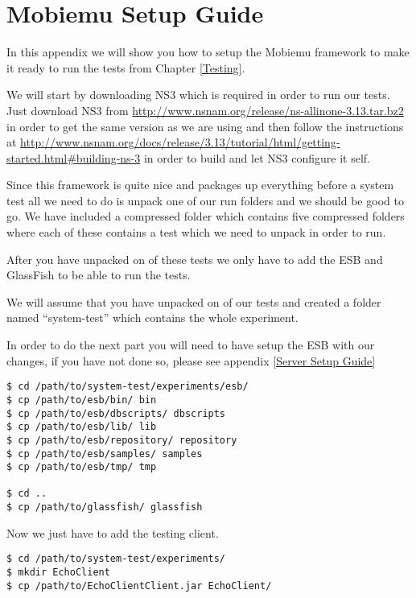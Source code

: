 \section{Mobiemu Setup Guide}\label{Mobiemu Setup Guide}
In this appendix we will show you how to setup the Mobiemu framework to make it ready to run the tests from Chapter \ref{Testing}.

We will start by downloading NS3 which is required in order to run our tests. Just download NS3 from \url{http://www.nsnam.org/release/ns-allinone-3.13.tar.bz2} in order to get the same version as we are using and then follow the instructions at \url{http://www.nsnam.org/docs/release/3.13/tutorial/html/getting-started.html#building-ns-3} in order to build and let NS3 configure it self.

Since this framework is quite nice and packages up everything before a system test all we need to do is unpack one of our run folders and we should be good to go. We have included a compressed folder which contains five compressed folders where each of these contains a test which we need to unpack in order to run.

After you have unpacked on of these tests we only have to add the ESB and GlassFish to be able to run the tests.

We will assume that you have unpacked on of our tests and created a folder named “system-test” which contains the whole experiment.

\begin{shaded}
In order to do the next part you will need to have setup the ESB with our changes, if you have not done so, please see appendix \ref{Server Setup Guide}
\end{shaded}

\lstset{language=bash}
\begin{lstlisting}[frame=single, caption={Copy ESB and GlassFish into System test}, label=mobiemu:copy esb, breaklines=true]
$ cd /path/to/system-test/experiments/esb/
$ cp /path/to/esb/bin/ bin
$ cp /path/to/esb/dbscripts/ dbscripts
$ cp /path/to/esb/lib/ lib
$ cp /path/to/esb/repository/ repository
$ cp /path/to/esb/samples/ samples
$ cp /path/to/esb/tmp/ tmp

$ cd ..
$ cp /path/to/glassfish/ glassfish
\end{lstlisting}

Now we just have to add the testing client.
\lstset{language=bash}
\begin{lstlisting}[frame=single, caption={Adding the test client}, label=mobiemu:adding test client, breaklines=true]
$ cd /path/to/system-test/experiments/
$ mkdir EchoClient
$ cp /path/to/EchoClientClient.jar EchoClient/
\end{lstlisting}

